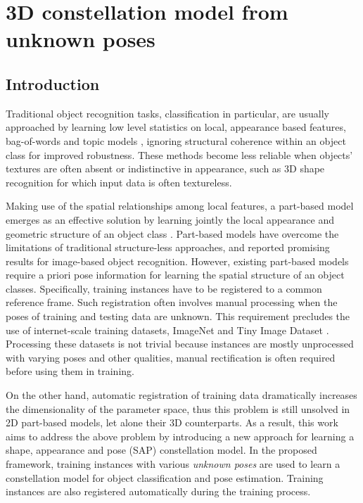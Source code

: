 \chapter{3D constellation model from unknown poses}
\label{chap/reg}

\section{Introduction}
\label{sec/reg/intro}

Traditional object recognition tasks, classification in particular, are usually approached by learning low level statistics on local, appearance based features, \eg bag-of-words \cite{Sivic2005, Fei-Fei2005} and topic models \cite{Fergus2005}, ignoring structural coherence within an object class for improved robustness. These methods become less reliable when objects' textures are often absent or indistinctive in appearance, such as 3D shape recognition for which input data is often textureless. 

Making use of the spatial relationships among local features, a part-based model emerges as an effective solution by learning jointly the local appearance and geometric structure of an object class \cite{Weber2000, Felzenszwalb2005, Fergus2007}. 
Part-based models have overcome the limitations of traditional structure-less approaches, and reported promising results for image-based object recognition. However, existing part-based models require a priori pose information for learning the spatial structure of an object classes. Specifically, training instances have to be registered to a common reference frame. Such registration often involves manual processing when the poses of training and testing data are unknown. This requirement precludes the use of internet-scale training datasets, \eg ImageNet \cite{Deng2009} and Tiny Image Dataset \cite{Torralba2008}. Processing these datasets is not trivial because instances are mostly unprocessed with varying poses and other qualities, manual rectification is often required before using them in training. 

On the other hand, automatic registration of training data dramatically increases the dimensionality of the parameter space, thus this problem is still unsolved in 2D part-based models, let alone their 3D counterparts. 
As a result, this work aims to address the above problem by introducing a new approach for learning a shape, appearance and pose (SAP) constellation model. 
In the proposed framework, training instances with various \emph{unknown poses} are used to learn a constellation model for object classification and pose estimation. Training instances are also registered automatically during the training process.

